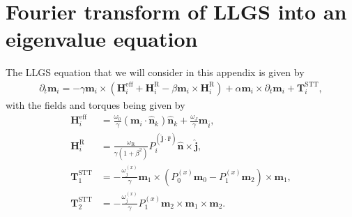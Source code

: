\chapter{Fourier transform of LLGS into an eigenvalue equation}\label{app:FourierLLGS}
The LLGS equation that we will consider in this appendix is given by
\begin{align}
    \label{eq:LLGS_app}
    \partial_t \mathbold{m}_i = -\gamma \mathbold{m}_i\times\left(\mathbold{H}^{\text{eff}}_i+\mathbold{H}^{\text{R}}_i - \beta\mathbold{m}_i\times\mathbold{H}^{\text{R}}_i\right) + \alpha\mathbold{m}_i \times\partial_t\mathbold{m}_i + \mathbold{T}^{\text{STT}}_i,
\end{align}
with the fields and torques being given by
\begin{subequations}
\begin{align}
    \mathbold{H}^{\text{eff}}_i &= \frac{\omega_0}{\gamma}\left( \mathbold{m}_i \cdot \mathbold{\hat{n}}_k\right)\mathbold{\hat{n}}_k + \frac{\omega_J}{\gamma} \mathbold{m}_{\bar{i}}, \\
    \mathbold{H}^{\text{R}}_i &= \frac{\omega_{\text{R}}}{\gamma(1+\beta^2)} P^{(\mathbold{\hat{j}}\cdot\mathbold{\hat{r}})}_i \mathbold{\hat{n}}\times\mathbold{\hat{j}}, \\
    \mathbold{T}^{\text{STT}}_1 &= -\frac{\omega^{(x)}_j}{\gamma} \mathbold{m}_1\times\left( P_0^{(x)}\mathbold{m}_0 - P_1^{(x)} \mathbold{m}_2\right) \times \mathbold{m}_1, \\
    \mathbold{T}^{\text{STT}}_2 &= -\frac{\omega^{(x)}_j}{\gamma} P_1^{(x)} \mathbold{m}_2\times \mathbold{m}_1 \times \mathbold{m}_2.
\end{align}
\end{subequations}
